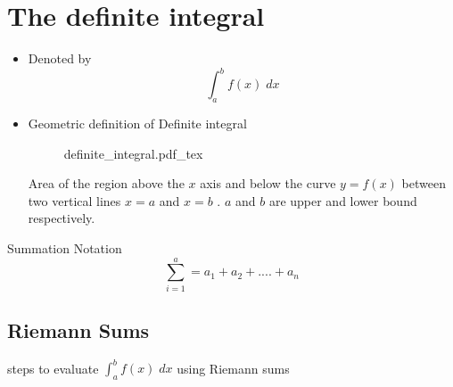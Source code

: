 \section{The definite integral}
\begin{itemize}

    \item Denoted by 
	    \begin{equation*}
	        \int^{b}_{a} f(x) \; dx
	    \end{equation*}
    \item  
     Geometric definition of Definite integral 
     \begin{figure}[h]
	\centering
	\def\svgwidth{0.7\columnwidth}
	{definite_integral.pdf_tex}
     \end{figure}
     Area of the region above the $x$ axis and below the curve $y = f(x)$
     between two vertical lines $x=a$ and $x=b$ . $a$ and $b$ are 
     upper and lower bound respectively. 
\end{itemize}
Summation Notation
\begin{equation*}
    \sum_{i=1}^{a} = a_{1} + a_{2} + .... + a_{n}
\end{equation*}

\subsection{Riemann Sums}

steps to evaluate $\int^{b}_{a} f(x) \; dx$ using Riemann sums 

